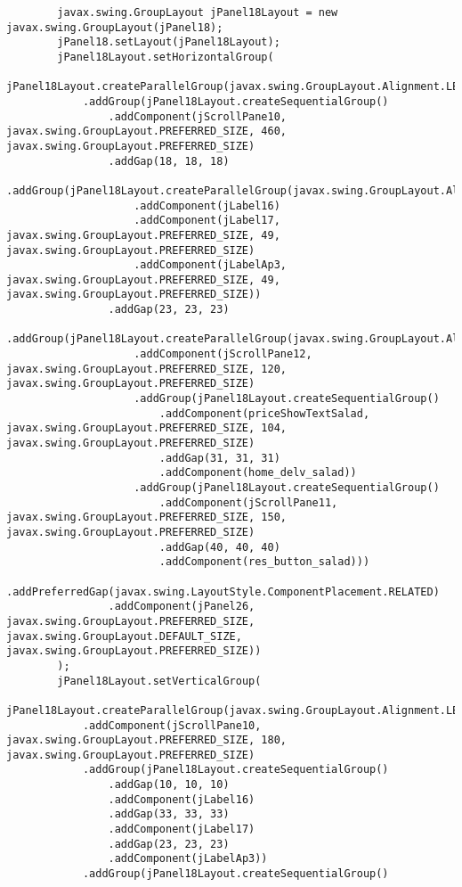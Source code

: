 \documentclass[12pt,a4paper]{article}
\begin{document}
\begin{lstlisting}
        javax.swing.GroupLayout jPanel18Layout = new javax.swing.GroupLayout(jPanel18);
        jPanel18.setLayout(jPanel18Layout);
        jPanel18Layout.setHorizontalGroup(
            jPanel18Layout.createParallelGroup(javax.swing.GroupLayout.Alignment.LEADING)
            .addGroup(jPanel18Layout.createSequentialGroup()
                .addComponent(jScrollPane10, javax.swing.GroupLayout.PREFERRED_SIZE, 460, javax.swing.GroupLayout.PREFERRED_SIZE)
                .addGap(18, 18, 18)
                .addGroup(jPanel18Layout.createParallelGroup(javax.swing.GroupLayout.Alignment.LEADING)
                    .addComponent(jLabel16)
                    .addComponent(jLabel17, javax.swing.GroupLayout.PREFERRED_SIZE, 49, javax.swing.GroupLayout.PREFERRED_SIZE)
                    .addComponent(jLabelAp3, javax.swing.GroupLayout.PREFERRED_SIZE, 49, javax.swing.GroupLayout.PREFERRED_SIZE))
                .addGap(23, 23, 23)
                .addGroup(jPanel18Layout.createParallelGroup(javax.swing.GroupLayout.Alignment.LEADING)
                    .addComponent(jScrollPane12, javax.swing.GroupLayout.PREFERRED_SIZE, 120, javax.swing.GroupLayout.PREFERRED_SIZE)
                    .addGroup(jPanel18Layout.createSequentialGroup()
                        .addComponent(priceShowTextSalad, javax.swing.GroupLayout.PREFERRED_SIZE, 104, javax.swing.GroupLayout.PREFERRED_SIZE)
                        .addGap(31, 31, 31)
                        .addComponent(home_delv_salad))
                    .addGroup(jPanel18Layout.createSequentialGroup()
                        .addComponent(jScrollPane11, javax.swing.GroupLayout.PREFERRED_SIZE, 150, javax.swing.GroupLayout.PREFERRED_SIZE)
                        .addGap(40, 40, 40)
                        .addComponent(res_button_salad)))
                .addPreferredGap(javax.swing.LayoutStyle.ComponentPlacement.RELATED)
                .addComponent(jPanel26, javax.swing.GroupLayout.PREFERRED_SIZE, javax.swing.GroupLayout.DEFAULT_SIZE, javax.swing.GroupLayout.PREFERRED_SIZE))
        );
        jPanel18Layout.setVerticalGroup(
            jPanel18Layout.createParallelGroup(javax.swing.GroupLayout.Alignment.LEADING)
            .addComponent(jScrollPane10, javax.swing.GroupLayout.PREFERRED_SIZE, 180, javax.swing.GroupLayout.PREFERRED_SIZE)
            .addGroup(jPanel18Layout.createSequentialGroup()
                .addGap(10, 10, 10)
                .addComponent(jLabel16)
                .addGap(33, 33, 33)
                .addComponent(jLabel17)
                .addGap(23, 23, 23)
                .addComponent(jLabelAp3))
            .addGroup(jPanel18Layout.createSequentialGroup()

\end{lstlisting}
\end{document}

